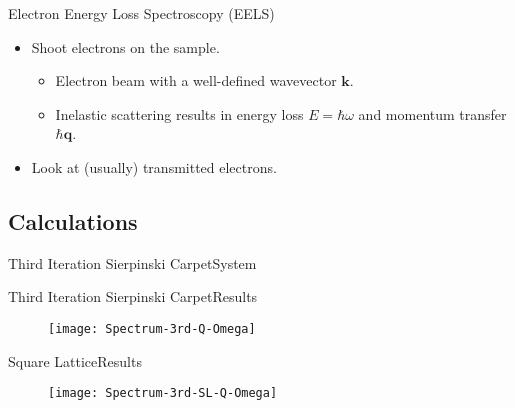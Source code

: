 \documentclass{beamer}
\begin{document}
\begin{frame}{Electron Energy Loss Spectroscopy (EELS)}
    \begin{itemize}
    \item<2-> Shoot electrons on the sample.
        \begin{itemize}
        \item<4-> Electron beam with a well-defined wavevector $\mathbf{k}$.
        \item<5-> Inelastic scattering results in \alert{energy loss $E = \hbar\omega$} and \alert{momentum transfer $\hbar\mathbf{q}$}.
        \end{itemize}
    \item<3-> Look at (usually) transmitted electrons.
    \end{itemize}
\end{frame}

\subsection{Calculations}

\begin{frame}{Third Iteration Sierpinski Carpet}{System}
    \begin{figure}
    \vspace{-.5cm}
    
    \end{figure}
\end{frame}

\begin{frame}{Third Iteration Sierpinski Carpet}{Results}
    \begin{figure}
    \texttt{[image: Spectrum-3rd-Q-Omega]}
    \end{figure}
\end{frame}

\begin{frame}{Square Lattice}{Results}
    \begin{figure}
    \texttt{[image: Spectrum-3rd-SL-Q-Omega]}
    \end{figure}
\end{frame}
\end{document}
